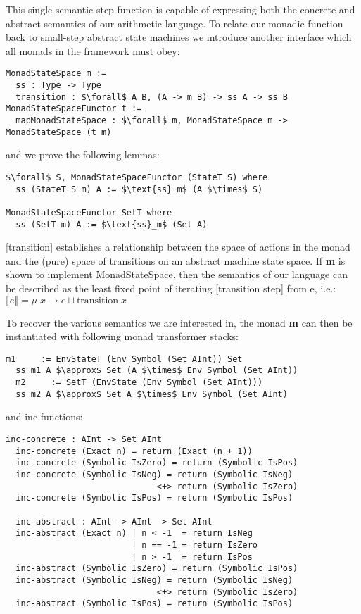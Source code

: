 \documentclass{article}
\begin{document}
This single semantic step function is capable of expressing both the concrete
and abstract semantics of our arithmetic language.
%
To relate our monadic function back to small-step abstract state machines we
introduce another interface which all monads in the framework must obey:
%
\begin{lstlisting}[mathescape]
MonadStateSpace m :=
  ss : Type -> Type
  transition : $\forall$ A B, (A -> m B) -> ss A -> ss B
MonadStateSpaceFunctor t :=
  mapMonadStateSpace : $\forall$ m, MonadStateSpace m -> MonadStateSpace (t m)
\end{lstlisting}
%
and we prove the following lemmas:
\begin{lstlisting}[mathescape]
$\forall$ S, MonadStateSpaceFunctor (StateT S) where 
  ss (StateT S m) A := $\text{ss}_m$ (A $\times$ S)

MonadStateSpaceFunctor SetT where
  ss (SetT m) A := $\text{ss}_m$ (Set A)
\end{lstlisting}

[transition] establishes a relationship between the space of actions in the
monad and the (pure) space of transitions on an abstract machine state space.
%
If \textbf{m} is shown to implement MonadStateSpace, then the semantics of our
language can be described as the least fixed point of iterating [transition
step] from e, i.e.:  $\llbracket e \rrbracket = \mu\; x \to e \sqcup
\text{transition}\; x$

To recover the various semantics we are interested in, the monad \textbf{m} can
then be instantiated with following monad transformer stacks:
\begin{lstlisting}[mathescape]
  m1     := EnvStateT (Env Symbol (Set AInt)) Set
  ss m1 A $\approx$ Set (A $\times$ Env Symbol (Set AInt))
  m2     := SetT (EnvState (Env Symbol (Set AInt)))
  ss m2 A $\approx$ Set A $\times$ Env Symbol (Set AInt)
\end{lstlisting}
and inc functions:
\begin{lstlisting}[mathescape]
  inc-concrete : AInt -> Set AInt
  inc-concrete (Exact n) = return (Exact (n + 1))
  inc-concrete (Symbolic IsZero) = return (Symbolic IsPos)
  inc-concrete (Symbolic IsNeg) = return (Symbolic IsNeg) 
                              <+> return (Symbolic IsZero)
  inc-concrete (Symbolic IsPos) = return (Symbolic IsPos)

  inc-abstract : AInt -> AInt -> Set AInt
  inc-abstract (Exact n) | n < -1  = return IsNeg
                         | n == -1 = return IsZero
                         | n > -1  = return IsPos
  inc-abstract (Symbolic IsZero) = return (Symbolic IsPos)
  inc-abstract (Symbolic IsNeg) = return (Symbolic IsNeg) 
                              <+> return (Symbolic IsZero)
  inc-abstract (Symbolic IsPos) = return (Symbolic IsPos)
\end{lstlisting}
\end{document}
